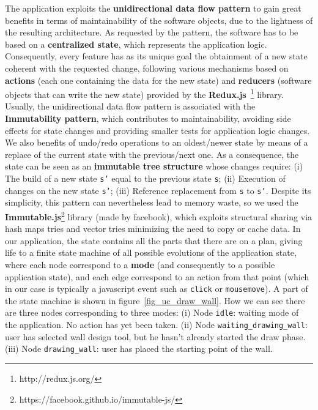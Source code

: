 The application exploits the \textbf{unidirectional data flow pattern} to gain great benefits in terms of maintainability of the software objects, due to the lightness of the resulting architecture. As requested by the pattern, the software has to be based on a \textbf{centralized state}, which represents the application logic. Consequently, every feature has as its unique goal the obtainment of a new state coherent with the requested change, following various mechanisms based on \textbf{actions} (each one containing the data for the new state) and \textbf{reducers} (software objects that can write the new state) provided by the \textbf{Redux.js}~\footnote{http://redux.js.org/} library. Usually, the unidirectional data flow pattern is associated with the \textbf{Immutability pattern}, which contributes to maintainability, avoiding side effects for state changes and providing smaller tests for application logic changes. We also benefits of undo/redo operations to an oldest/newer state by means of a replace of the current state with the previous/next one. As a consequence, the state can be seen as an \textbf{immutable tree structure} whose changes require: (i) The build of a new state \texttt{s'} equal to the previous state \texttt{s}; (ii) Execution of changes on the new state \texttt{s'}; (iii) Reference replacement from \texttt{s} to \texttt{s'}. Despite its simplicity, this pattern can nevertheless lead to memory waste, so we used the \textbf{Immutable.js}\footnote{https://facebook.github.io/immutable-js/} library (made by facebook), which exploits structural sharing via hash maps tries and vector tries minimizing the need to copy or cache data.
In our application, the state contains all the parts that there are on a plan, giving life to a finite state machine of all possible evolutions of the application state, where each node correspond to a \textbf{mode} (and consequently to a possible application state), and each edge correspond to an action from that point (which in our case is typically a javascript event such as \texttt{click} or \texttt{mousemove}). A part of the state machine is shown in figure~\ref{fig_uc_draw_wall}. How we can see there are three nodes corresponding to three modes: (i) Node \texttt{idle}: waiting mode of the application. No action has yet been taken. (ii) Node \texttt{waiting\_drawing\_wall}: user has selected wall design tool, but he hasn't already started the draw phase. (iii) Node \texttt{drawing\_wall}: user has placed the starting point of the wall.

